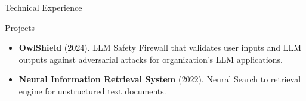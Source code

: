\documentclass[]{mcdowellcv}
\begin{document}
    \begin{cvsection}{Technical Experience}
        \begin{cvsubsection}{Projects}{}{}
            \begin{itemize}
				
				
				
				\item \textbf{OwlShield} (2024). LLM Safety Firewall that validates user inputs and LLM outputs against adversarial attacks for organization’s LLM applications.
				
				
				
				\item \textbf{Neural Information Retrieval System} (2022). Neural Search to retrieval engine for unstructured text documents.
				
				
				
				
				
				
				
				
				
				
				
				
				
				
				
				
				
				
				
				
				
				
				
				
				
				
				
				
				
            \end{itemize}
        \end{cvsubsection}
	\end{cvsection}
\end{document}
